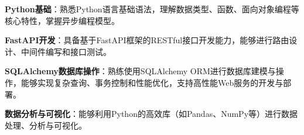 \item \textbf{Python基础}：熟悉Python语言基础语法，理解数据类型、函数、面向对象编程等核心特性，掌握异步编程模型。
\item \textbf{FastAPI开发}：具备基于FastAPI框架的RESTful接口开发能力，能够进行路由设计、中间件编写和接口测试。
\item \textbf{SQLAlchemy数据库操作}：熟练使用SQLAlchemy ORM进行数据库建模与操作，能够实现复杂查询、事务控制和性能优化，支持高性能Web服务的开发与部署。
\item \textbf{数据分析与可视化}：能够利用Python的高效库（如Pandas、NumPy等）进行数据处理、分析与可视化。